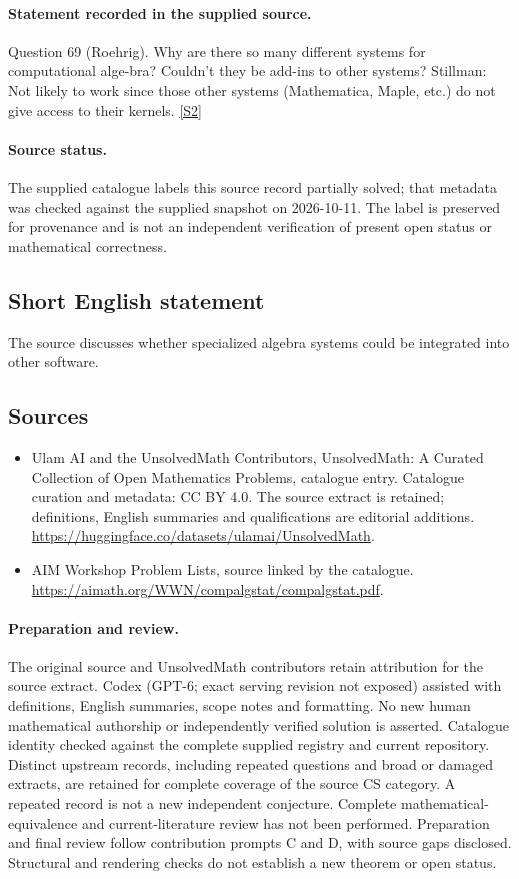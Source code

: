 \documentclass[11pt]{article}
\begin{document}
\paragraph{Statement recorded in the supplied source.}
Question 69 (Roehrig). Why are there so many different systems for computational alge-bra? Couldn't they be add-ins to other systems? Stillman: Not likely to work since those other systems (Mathematica, Maple, etc.) do not give access to their kernels. \href{https://aimath.org/WWN/compalgstat/compalgstat.pdf}{[S2]}
\paragraph{Source status.}
The supplied catalogue labels this source record partially solved; that metadata was checked against the supplied snapshot on 2026-10-11. The label is preserved for provenance and is not an independent verification of present open status or mathematical correctness.
\subsection{Short English statement}
The source discusses whether specialized algebra systems could be integrated into other software.
\subsection{Sources}
\begin{itemize}
\item[S1] Ulam AI and the UnsolvedMath Contributors, UnsolvedMath: A Curated Collection of Open Mathematics Problems, catalogue entry. Catalogue curation and metadata: CC BY 4.0. The source extract is retained; definitions, English summaries and qualifications are editorial additions.
\url{https://huggingface.co/datasets/ulamai/UnsolvedMath}.
\item[S2] AIM Workshop Problem Lists, source linked by the catalogue.
\url{https://aimath.org/WWN/compalgstat/compalgstat.pdf}.
\end{itemize}
\paragraph{Preparation and review.}
The original source and UnsolvedMath contributors retain attribution for the source extract. Codex (GPT-6; exact serving revision not exposed) assisted with definitions, English summaries, scope notes and formatting. No new human mathematical authorship or independently verified solution is asserted. Catalogue identity checked against the complete supplied registry and current repository. Distinct upstream records, including repeated questions and broad or damaged extracts, are retained for complete coverage of the source CS category. A repeated record is not a new independent conjecture. Complete mathematical-equivalence and current-literature review has not been performed. Preparation and final review follow contribution prompts C and D, with source gaps disclosed. Structural and rendering checks do not establish a new theorem or open status.
\label{end:statement}
\end{document}
